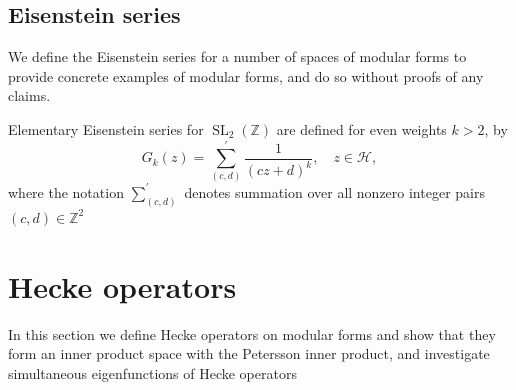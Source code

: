 \documentclass[10pt,leqno,twoside,b5paper]{article}
\theoremstyle{plain}
\theoremstyle{definition}
\numberwithin{equation}{section}
\numberwithin{lem}{section}
\newcommand{\textib}[1]{\textbf{\textit{#1\index{#1}}}} %
\DeclareMathOperator{\SL}{SL}
\newcommand{\slz}{\SL_2(\mathbb{Z})}
\newcommand{\tbd}{{\Huge\color{red}{\textib{TBD}}}}
\begin{document}
\subsection{Eisenstein series}
We define the Eisenstein series for a number of spaces of modular forms to provide concrete examples of modular forms, and do so without proofs of any claims.

Elementary Eisenstein series for $\slz$ are defined for even weights $k>2$, by \[G_k(z) = \sum_{(c,d)}^\prime \frac{1}{(cz+d)^k},\quad z\in\mathcal H,\] where the notation $\sum_{(c,d)}^\prime$ denotes summation over all nonzero integer pairs $(c,d)\in\mathbb Z^2$

\newpage\section{Hecke operators}
In this section we define Hecke operators on modular forms and show that they form an inner product space with the Petersson inner product, and investigate simultaneous eigenfunctions of Hecke operators \tbd
\end{document}
